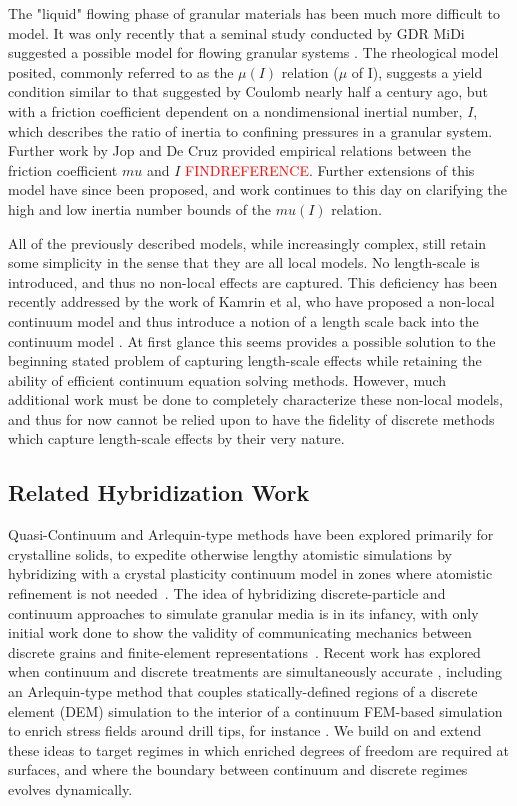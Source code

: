 The "liquid" flowing phase of granular materials has been much more difficult to model. It was only recently that a seminal study conducted by GDR MiDi suggested a possible model for flowing granular systems \cite{Midi:2004:Dense}. The rheological model posited, commonly referred to as the $\mu(I)$ relation ($\mu$ of I), suggests a yield condition similar to that suggested by Coulomb nearly half a century ago, but with a friction coefficient dependent on a nondimensional inertial number, $I$, which describes the ratio of inertia to confining pressures in a granular system. Further work by Jop and De Cruz provided empirical relations between the friction coefficient $mu$ and $I$ \cite{Jop:2006:Constitutive}\textcolor{red}{FINDREFERENCE}. Further extensions of this model have since been proposed, and work continues to this day on clarifying the high and low inertia number bounds of the $mu(I)$ relation. 

All of the previously described models, while increasingly complex, still retain some simplicity in the sense that they are all local models. No length-scale is introduced, and thus no non-local effects are captured. This deficiency has been recently addressed by the work of Kamrin et al, who have proposed a non-local continuum model and thus introduce a notion of a length scale back into the continuum model \cite{Kamrin:2012:Nonlocal}. At first glance this seems provides a possible solution to the beginning stated problem of capturing length-scale effects while retaining the ability of efficient continuum equation solving methods. However, much additional work must be done to completely characterize these non-local models, and thus for now cannot be relied upon to have the fidelity of discrete methods which capture length-scale effects by their very nature.

\subsection{Related Hybridization Work}
Quasi-Continuum and Arlequin-type methods have been
explored primarily for crystalline solids, to expedite otherwise lengthy atomistic simulations by hybridizing with a
crystal plasticity continuum model in zones where atomistic refinement is not
needed~\cite{Tadmor:1996,Smith:2001,Shimokawa:2007,Zhang:2005,Dhia:1998}. The idea of hybridizing discrete-particle and
continuum approaches to simulate granular media is in its infancy, with only initial work done to show the validity of
communicating mechanics between discrete grains and finite-element representations~\cite{Yan:2010}. Recent work has explored when
continuum and discrete treatments are simultaneously accurate \cite{Rycroft:2009,Kamrin:2010,Kamrin:2014}, including an
Arlequin-type method that couples statically-defined regions of a discrete element (DEM) simulation to the interior of a continuum
FEM-based simulation to enrich stress fields around drill tips, for instance \cite{Wellmann:2012}. We build on and extend these ideas to
target regimes in which enriched degrees of freedom are required at surfaces, and where the boundary between continuum
and discrete regimes evolves dynamically.

